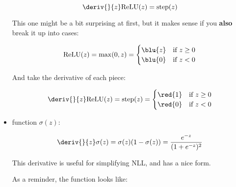 \begin{itemize}
                \begin{equation}
                    \deriv{}{z} \text{ReLU}(z) = \text{step}(z)
                \end{equation}
                
                This one might be a bit surprising at first, but it makes sense if you \textbf{also} break it up into cases:
                
                \begin{equation}
                    \text{ReLU}(z) 
                    =
                    \max(0,z)
                    =
                    \begin{cases}
                      \blu{z} & \text{if $z \geq 0$}\\
                      \blu{0} & \text{if $z < 0$}
                    \end{cases}
                \end{equation}
                
                And take the derivative of each piece:
                
                \begin{equation}
                    \deriv{}{z} \text{ReLU}(z)
                    =
                    \text{step}(z) 
                    =
                    \begin{cases}
                      \red{1} & \text{if $z \geq 0$}\\
                      \red{0} & \text{if $z < 0$}
                    \end{cases}
                \end{equation}
               
                
            \item {} function $\sigma(z)$:
            
                \begin{equation}
                    \deriv{}{z}\sigma(z) 
                    =
                    \sigma(z)(1-\sigma(z))
                    =
                    \frac{e^{-z}}{(1+e^{-z})^2}
                \end{equation}
                
                This derivative is useful for simplifying NLL, and has a nice form.
                    
                As a reminder, the function looks like:
                

\end{itemize}
